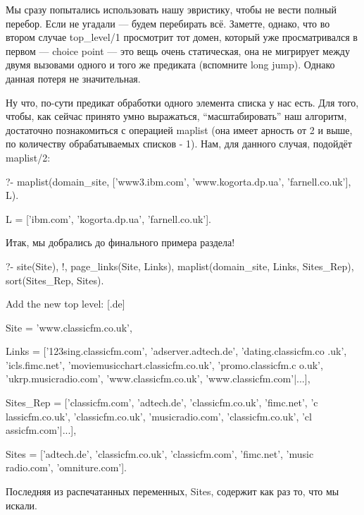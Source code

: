 \documentclass[a4paper]{book}
\begin{document}
Мы сразу попытались использовать нашу эвристику, чтобы не вести
полный перебор. Если не угадали --- будем перебирать
всё. Заметте, однако, что во втором случае top_level/1 просмотрит
тот домен, который уже просматривался в первом --- choice point
--- это вещь очень статическая, она не мигрирует между двумя
вызовами одного и того же предиката (вспомните long jump). Однако
данная потеря не значительная.

Ну что, по-сути предикат обработки одного элемента списка у нас
есть. Для того, чтобы, как сейчас принято умно выражаться,
``масштабировать'' наш алгоритм, достаточно познакомиться с
операцией maplist (она имеет арность от 2 и выше, по количеству
обрабатываемых списков - 1). Нам, для данного случая, подойдёт
maplist/2:

\begin{example}{}{}
?- maplist(domain_site, 
           ['www3.ibm.com', 'www.kogorta.dp.ua',
             'farnell.co.uk'], L).

L = ['ibm.com', 'kogorta.dp.ua', 'farnell.co.uk'].
\end{example}

Итак, мы добрались до финального примера раздела!

\begin{example}{}{}
?- site(Site), !,  %
   page_links(Site, Links), %
   maplist(domain_site, Links, Sites_Rep), %
   sort(Sites_Rep, Sites). %

Add the new top level: [.de]

Site = 'www.classicfm.co.uk',

Links = ['123sing.classicfm.com', 'adserver.adtech.de',
  'dating.classicfm.co .uk', 'icls.fimc.net',
  'moviemusicchart.classicfm.co.uk', 'promo.classicfm.c o.uk',
  'ukrp.musicradio.com', 'www.classicfm.co.uk',
  'www.classicfm.com'|...],                                                                        
 
Sites_Rep = ['classicfm.com', 'adtech.de', 'classicfm.co.uk',
  'fimc.net', 'c lassicfm.co.uk', 'classicfm.co.uk',
  'musicradio.com', 'classicfm.co.uk', 'cl assicfm.com'|...],                                                        
 
Sites = ['adtech.de', 'classicfm.co.uk', 'classicfm.com',
  'fimc.net', 'music radio.com', 'omniture.com'].                                               
\end{example}

Последняя из распечатанных переменных, Sites, содержит как раз
то, что мы искали.
\end{document}
